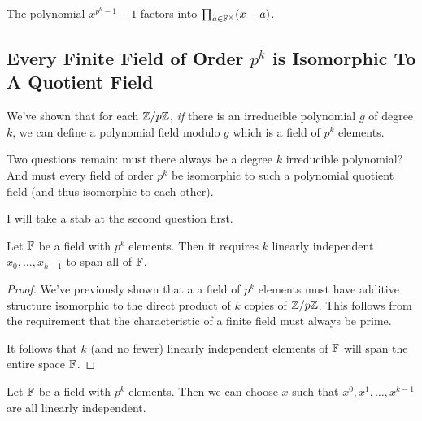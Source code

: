 \begin{corollary}
  The polynomial $x^{p^k - 1} - 1$ factors into $\prod_{a\in \mathbb{F}^\times}
  \mathopen{}\left( {x - a} \right)\mathclose{}$.
\end{corollary}

\subsection{Every Finite Field of Order $p^k$ is Isomorphic To A Quotient Field}

\begin{remark}
  We've shown that for each $\mathbb{Z} / p\mathbb{Z}$, \emph{if} there is an irreducible
  polynomial $g$ of degree $k$, we can define a polynomial field modulo
  $g$ which is a field of $p^k$ elements.

  Two questions remain: must there always be a degree $k$ irreducible
  polynomial? And must every field of order $p^k$ be isomorphic to such
  a polynomial quotient field (and thus isomorphic to each other).

  I will take a stab at the second question first.
\end{remark}

\begin{lemma}
  Let $\mathbb{F}$ be a field with $p^k$ elements. Then it requires $k$ linearly
  independent $x_0, \ldots, x_{k-1}$ to span all of $\mathbb{F}$.
\end{lemma}

\begin{proof}
  We've previously shown that a a field of $p^k$ elements must have
  additive structure isomorphic to the direct product of $k$ copies of
  $\mathbb{Z} / p\mathbb{Z}$. This follows from the requirement that the characteristic of
  a finite field must always be prime.

  It follows that $k$ (and no fewer) linearly independent elements of
  $\mathbb{F}$ will span the entire space $\mathbb{F}$.
\end{proof}

\begin{lemma}
  Let $\mathbb{F}$ be a field with $p^k$ elements. Then we can choose $x$ such
  that $x^0, x^1, \ldots, x^{k-1}$ are all linearly independent.
\end{lemma}


